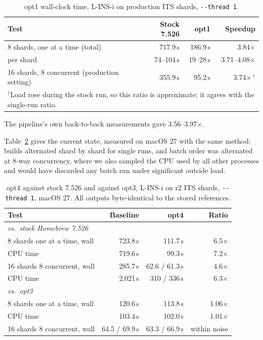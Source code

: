 \documentclass[11pt]{article}
\newcommand{\code}[1]{\texttt{#1}}
\begin{document}
\begin{table}[h]
\centering
\caption{opt1 wall-clock time, L-INS-i on production ITS shards, \code{-{}-thread 1}.}
\label{tab:wall}
\begin{tabular}{lrrr}
\toprule
Test & Stock 7.526 & opt1 & Speedup \\
\midrule
8 shards, one at a time (total) & 717.9\,s & 186.9\,s & 3.84$\times$ \\
\quad per shard & 74--104\,s & 19--28\,s & 3.71--4.08$\times$ \\
16 shards, 8 concurrent (production setting) & 355.9\,s & 95.2\,s & 3.74$\times$\,$^\dagger$ \\
\bottomrule
\multicolumn{4}{l}{\footnotesize $^\dagger$Load rose during the stock run, so this ratio is
approximate; it agrees with the single-run ratio.}
\end{tabular}
\end{table}

The pipeline's own back-to-back measurements gave 3.56--3.97$\times$.

Table~\ref{tab:wall4} gives the current state, measured on macOS 27 with the same method:
builds alternated shard by shard for single runs, and batch order was alternated at 8-way
concurrency, where we also sampled the CPU used by all other processes and would have
discarded any batch run under significant outside load.

\begin{table}[h]
\centering
\caption{opt4 against stock 7.526 and against opt3, L-INS-i on r2 ITS shards,
\code{-{}-thread 1}, macOS 27. All outputs byte-identical to the stored references.}
\label{tab:wall4}
\begin{tabular}{lrrr}
\toprule
Test & Baseline & opt4 & Ratio \\
\midrule
\multicolumn{4}{l}{\emph{vs.\ stock Homebrew 7.526}} \\
8 shards one at a time, wall & 723.8\,s & 111.7\,s & 6.5$\times$ \\
\quad CPU time & 719.6\,s & 99.3\,s & 7.2$\times$ \\
16 shards 8 concurrent, wall & 285.7\,s & 62.6 / 61.3\,s & 4.6$\times$ \\
\quad CPU time & 2{,}021\,s & 310 / 336\,s & 6.3$\times$ \\
\midrule
\multicolumn{4}{l}{\emph{vs.\ opt3}} \\
8 shards one at a time, wall & 120.6\,s & 113.8\,s & 1.06$\times$ \\
\quad CPU time & 103.4\,s & 102.0\,s & 1.01$\times$ \\
16 shards 8 concurrent, wall & 64.5 / 69.9\,s & 63.3 / 66.9\,s & within noise \\
\bottomrule
\end{tabular}
\end{table}
\end{document}
